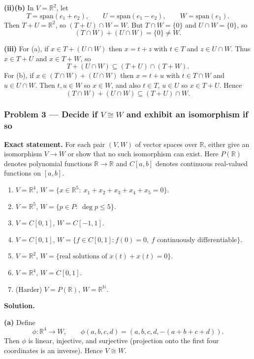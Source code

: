 \documentclass[12pt,a4paper]{article}
\theoremstyle{plain}
\theoremstyle{definition}      %
\begin{document}
\medskip
\textbf{(ii)(b)} In $V=\mathbb R^2$, let
\[
T=\mathrm{span}(e_1+e_2),\qquad U=\mathrm{span}(e_1-e_2),\qquad W=\mathrm{span}(e_1).
\]
Then $T+U=\mathbb R^2$, so $(T+U)\cap W=W$. But $T\cap W=\{0\}$ and $U\cap W=\{0\}$, so
\[
(T\cap W)+(U\cap W)=\{0\}\neq W.
\]

\medskip
\textbf{(iii)} For (a), if $x\in T+(U\cap W)$ then $x=t+z$ with $t\in T$ and $z\in U\cap W$.
Thus $x\in T+U$ and $x\in T+W$, so
\[
T+(U\cap W)\subseteq (T+U)\cap(T+W).
\]
For (b), if $x\in (T\cap W)+(U\cap W)$ then $x=t+u$ with $t\in T\cap W$ and $u\in U\cap W$.
Then $t,u\in W$ so $x\in W$, and also $t\in T$, $u\in U$ so $x\in T+U$. Hence
\[
(T\cap W)+(U\cap W)\subseteq (T+U)\cap W.
\]

\bigskip

\subsubsection*{Problem 3 — Decide if $V\cong W$ and exhibit an isomorphism if so}

\textbf{Exact statement.}
For each pair $(V,W)$ of vector spaces over $\mathbb R$, either give an isomorphism $V\to W$
or show that no such isomorphism can exist. Here $P(\mathbb R)$ denotes polynomial functions $\mathbb R\to\mathbb R$
and $C[a,b]$ denotes continuous real-valued functions on $[a,b]$.
\begin{enumerate}
	\item[(a)] $V=\mathbb R^4$, $W=\{x\in\mathbb R^5:\ x_1+x_2+x_3+x_4+x_5=0\}$.
	\item[(b)] $V=\mathbb R^5$, $W=\{p\in P:\ \deg p\le 5\}$.
	\item[(c)] $V=C[0,1]$, $W=C[-1,1]$.
	\item[(d)] $V=C[0,1]$, $W=\{f\in C[0,1]: f(0)=0,\ f\text{ continuously differentiable}\}$.
	\item[(e)] $V=\mathbb R^2$, $W=\{\text{real solutions of } \ddot x(t)+x(t)=0\}$.
	\item[(f)] $V=\mathbb R^4$, $W=C[0,1]$.
	\item[(g)] (Harder) $V=P(\mathbb R)$, $W=\mathbb R^{\mathbb N}$.
\end{enumerate}

\textbf{Solution.}

\medskip
\noindent\textbf{(a)} Define
\[
\phi:\mathbb R^4\to W,\qquad \phi(a,b,c,d)=(a,b,c,d,-(a+b+c+d)).
\]
Then $\phi$ is linear, injective, and surjective (projection onto the first four coordinates is an inverse).
Hence $V\cong W$.
\end{document}
